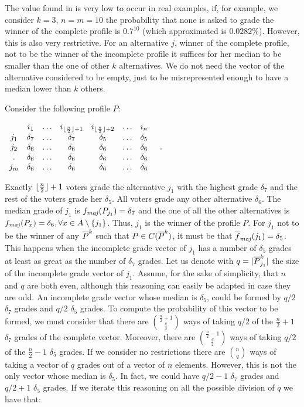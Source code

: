 	The value found in  is very low to occur in real examples, if, for example, we consider $k=3$, $n=m=10$ the probability that none is asked to grade the winner of the complete profile is $0.7^{10}$ (which approximated is $0.0282\%$).
	However, this is also very restrictive. For an alternative $j$, winner of the complete profile, not to be the winner of the incomplete profile it suffices for her median to be smaller than the one of other $k$ alternatives. 
	We do not need the vector of the alternative considered to be empty, just to be misrepresented enough to have a median lower than $k$ others.
	
	\begin{example} \normalfont
		Consider the following profile $P$:
		\begin{center}
			$
			\begin{array}{ccccccc}
					& i_1 & \dots & i_{\lfloor\frac{n}{2}\rfloor + 1} & i_{\lfloor\frac{n}{2}\rfloor + 2} & \dots & i_n \\
				j_1 & \delta_7 & \dots &\delta_7 & \delta_5 & \dots & \delta_5 \\
				j_2 & \delta_6 & \dots &\delta_6 & \delta_6 & \dots & \delta_6 \\
				. & \delta_6 & \dots &\delta_6 & \delta_6 & \dots & \delta_6 \\
				j_m & \delta_6 & \dots &\delta_6 & \delta_6 & \dots & \delta_6 \\
			\end{array} \quad.
			$
		\end{center}	
		Exactly $\lfloor\frac{n}{2}\rfloor + 1$ voters grade the alternative $j_1$ with the highest grade $\delta_7$ and the rest of the voters grade her $\delta_5$. All voters grade any other alternative $\delta_6$.
		The median grade of $j_1$ is $\fmaj(P_{j_1})=\delta_7$ and the one of all the other alternatives is $\fmaj(P_x)=\delta_6, \forall x \in A \setminus \{j_1\}$. Thus, $j_1$ is the winner of the profile $P$.
		For $j_1$ not to be the winner of any $\overline{P}^k$ such that $P \in C(\overline{P}^k)$, it must be that $\fmajbar(j_1)=\delta_5$. This happens when the incomplete grade vector of $j_1$ has a number of $\delta_5$ grades at least as great as the number of $\delta_7$ grades. 
		Let us denote with $q=|\overline{P}^k_{j_1}|$ the size of the incomplete grade vector of $j_1$.
		Assume, for the sake of simplicity, that $n$ and $q$ are both even, although this reasoning can easily be adapted in case they are odd.
		An incomplete grade vector whose median is $\delta_5$, could be formed by $q/2$ $\delta_7$ grades and $q/2$ $\delta_5$ grades. To compute the probability of this vector to be formed, we must consider that there are $\binom{\frac{n}{2}+1}{ \frac{q}{2}}$ ways of taking $q/2$ of the $\frac{n}{2}+1$ $\delta_7$ grades of the complete vector. Moreover, there are $\binom{\frac{n}{2}-1}{ \frac{q}{2}}$ ways of taking $q/2$ of the $\frac{n}{2}-1$ $\delta_5$ grades. If we consider no restrictions there are $\binom{n}{q}$ ways of taking a vector of $q$ grades out of a vector of $n$ elements.
		However, this is not the only vector whose median is $\delta_5$. In fact, we could have $q/2-1$ $\delta_7$ grades and $q/2+1$ $\delta_5$ grades. If we iterate this reasoning on all the possible division of $q$ we have that:
	

\end{example}
